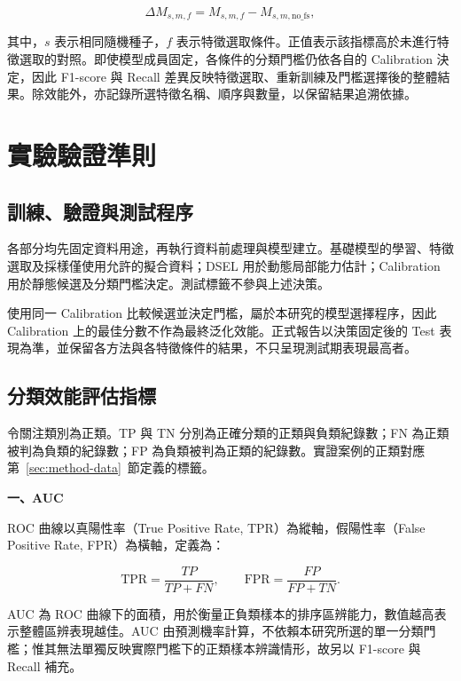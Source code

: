 \begin{equation}\label{eq:method-delta}
\Delta M_{s,m,f}
=M_{s,m,f}-M_{s,m,\mathrm{no\_fs}},
\end{equation}

其中，\(s\) 表示相同隨機種子，\(f\) 表示特徵選取條件。正值表示該指標高於未進行特徵選取的對照。即使模型成員固定，各條件的分類門檻仍依各自的 Calibration 決定，因此 F1-score 與 Recall 差異反映特徵選取、重新訓練及門檻選擇後的整體結果。除效能外，亦記錄所選特徵名稱、順序與數量，以保留結果追溯依據。

\section{實驗驗證準則}\label{sec:method-validation}

\subsection{訓練、驗證與測試程序}

各部分均先固定資料用途，再執行資料前處理與模型建立。基礎模型的學習、特徵選取及採樣僅使用允許的擬合資料；DSEL 用於動態局部能力估計；Calibration 用於靜態候選及分類門檻決定。測試標籤不參與上述決策。

使用同一 Calibration 比較候選並決定門檻，屬於本研究的模型選擇程序，因此 Calibration 上的最佳分數不作為最終泛化效能。正式報告以決策固定後的 Test 表現為準，並保留各方法與各特徵條件的結果，不只呈現測試期表現最高者。

\subsection{分類效能評估指標}

令關注類別為正類。TP 與 TN 分別為正確分類的正類與負類紀錄數；FN 為正類被判為負類的紀錄數；FP 為負類被判為正類的紀錄數。實證案例的正類對應第~\ref{sec:method-data}~節定義的標籤。

\textbf{一、AUC}

ROC 曲線以真陽性率（True Positive Rate, TPR）為縱軸，假陽性率（False Positive Rate, FPR）為橫軸，定義為：

\begin{equation}\label{eq:method-roc}
\mathrm{TPR}=\frac{TP}{TP+FN},\qquad
\mathrm{FPR}=\frac{FP}{FP+TN}.
\end{equation}

AUC 為 ROC 曲線下的面積，用於衡量正負類樣本的排序區辨能力，數值越高表示整體區辨表現越佳。AUC 由預測機率計算，不依賴本研究所選的單一分類門檻；惟其無法單獨反映實際門檻下的正類樣本辨識情形，故另以 F1-score 與 Recall 補充。

